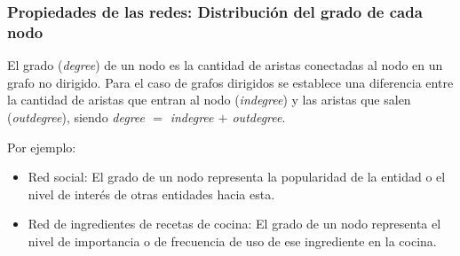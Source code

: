 \documentclass[
10pt, %
aspectratio=169, %
]{beamer}
\begin{document}
	\begin{frame}
		
		\frametitle{Propiedades de las redes: Distribución del grado de cada nodo}
		
		\begin{alertblock}{}
			El grado (\emph{degree}) de un nodo es la cantidad de aristas conectadas al nodo en un grafo no dirigido. Para el caso de grafos dirigidos se establece una diferencia entre la cantidad de aristas que entran al nodo (\emph{indegree}) y las aristas que salen (\emph{outdegree}), siendo \emph{degree $=$ indegree $+$ outdegree}.
		\end{alertblock}
		
		\vspace{1.5\baselineskip}
		
		Por ejemplo:
		\begin{itemize}
			\item Red social: El grado de un nodo representa la popularidad de la entidad o el nivel de interés de otras entidades hacia esta.
			\item Red de ingredientes de recetas de cocina: El grado de un nodo representa el nivel de importancia o de frecuencia de uso de ese ingrediente en la cocina. 
		\end{itemize}
		
	\end{frame}
	
\end{document}
